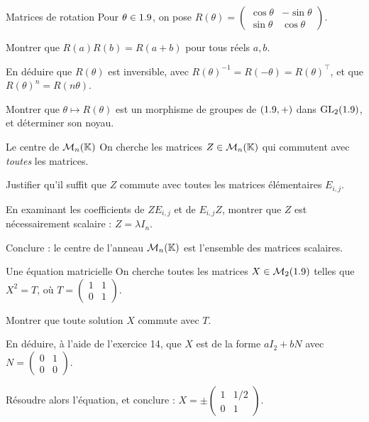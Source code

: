 \begin{exercice}[2]{Matrices de rotation}
Pour $\theta\in1.9$, on pose
$R(\theta)=\begin{pmatrix}\cos\theta&-\sin\theta\\\sin\theta&\cos\theta\end{pmatrix}$.
\begin{questions}
  \item Montrer que $R(a)R(b)=R(a+b)$ pour tous réels $a,b$.
  \item En déduire que $R(\theta)$ est inversible, avec
    $R(\theta)^{-1}=R(-\theta)=R(\theta)^{\top}$, et que
    $R(\theta)^{n}=R(n\theta)$.
  \item Montrer que $\theta\mapsto R(\theta)$ est un morphisme de groupes
    de $(1.9,+)$ dans $\mathrm{GL}_2(1.9)$, et déterminer son noyau.
\end{questions}
\end{exercice}


\begin{exercice}[3]{Le centre de $\mathcal{M}_n(\mathbb{K})$}
On cherche les matrices $Z\in\mathcal{M}_n(\mathbb{K})$ qui commutent avec
\emph{toutes} les matrices.
\begin{questions}
  \item Justifier qu'il suffit que $Z$ commute avec toutes les matrices
    élémentaires $E_{i,j}$.
  \item En examinant les coefficients de $ZE_{i,j}$ et de $E_{i,j}Z$,
    montrer que $Z$ est nécessairement scalaire : $Z=\lambda I_n$.
  \item Conclure : le centre de l'anneau $\mathcal{M}_n(\mathbb{K})$ est
    l'ensemble des matrices scalaires.
\end{questions}
\end{exercice}

\begin{exercice}[3]{Une équation matricielle}
On cherche toutes les matrices $X\in\mathcal{M}_2(1.9)$ telles que
$X^{2}=T$, où $T=\begin{pmatrix}1&1\\0&1\end{pmatrix}$.
\begin{questions}
  \item Montrer que toute solution $X$ commute avec $T$.
  \item En déduire, à l'aide de l'exercice 14, que $X$ est de la forme
    $aI_2+bN$ avec $N=\begin{pmatrix}0&1\\0&0\end{pmatrix}$.
  \item Résoudre alors l'équation, et conclure :
    $X=\pm\begin{pmatrix}1&1/2\\0&1\end{pmatrix}$.
\end{questions}
\end{exercice}

